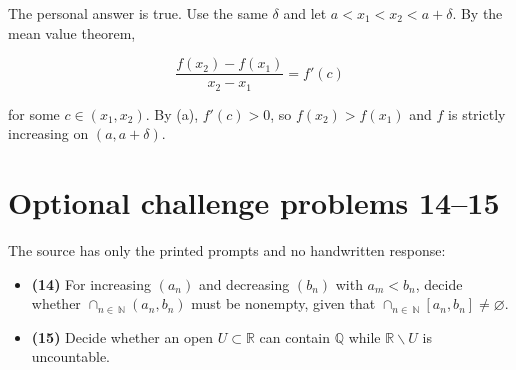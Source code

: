 The personal answer is true. Use the same \(\delta\) and let \(a < x_{1} < x_{2} < a + \delta\). By the mean value theorem,

\[\frac{f\left( x_{2} \right) - f\left( x_{1} \right)}{x_{2} - x_{1}} = f'(c)\]

for some \(c \in \left( {x_{1},x_{2}} \right)\). By (a), \(f'(c) > 0\), so \(f\left( x_{2} \right) > f\left( x_{1} \right)\) and \(f\) is strictly increasing on \(\left( {a,a + \delta} \right)\).

\section{Optional challenge problems 14--15}

The source has only the printed prompts and no handwritten response:

\begin{itemize}
\tightlist
\item
  \textbf{(14)} For increasing \(\left( a_{n} \right)\) and decreasing \(\left( b_{n} \right)\) with \(a_{m} < b_{n}\), decide whether \(\cap_{n \in \ \mathbb{N}}\left( {a_{n},b_{n}} \right)\) must be nonempty, given that \(\cap_{n \in \ \mathbb{N}}\left\lbrack {a_{n},b_{n}} \right\rbrack \neq \varnothing\).
\item
  \textbf{(15)} Decide whether an open \(U \subset \mathbb{R}\) can contain \(\mathbb{Q}\) while \(\mathbb{R} \smallsetminus U\) is uncountable.
\end{itemize}
